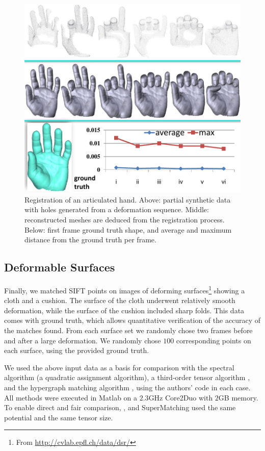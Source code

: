 \begin{figure}[t!]
\centering
  \includegraphics[width=0.95\linewidth]{figures/3DHand.pdf}
  \caption{Registration of an articulated hand.
  Above: partial synthetic data with holes generated from a deformation sequence.
  Middle: reconstructed meshes are deduced from the registration process.
  Below: first frame ground truth shape, and average and maximum distance from the ground truth per frame.}
\label{fig:3DHand}
\end{figure}

\subsection{Deformable Surfaces}
\label{subsec:2DDeformable}

Finally, we matched SIFT points on images of deforming surfaces\footnote{From \url{http://cvlab.epfl.ch/data/dsr/}} showing a cloth and a cushion.
The surface of the cloth underwent relatively smooth deformation, while the surface of the cushion included sharp folds.
This data comes with ground truth, which allows quantitative verification of the accuracy of the matches found.
From each surface set we randomly chose two frames before and after a large deformation.
We randomly chose $100$ corresponding points on each surface, using the provided ground truth.

We used the above input data as a basis for comparison with the spectral algorithm \cite{Cour06} (a quadratic assignment algorithm),
a third-order tensor algorithm \cite{Duchenne09},
and the hypergraph matching algorithm \cite{Zass08}, using the authors' code in each case.
All methods were executed in Matlab on a $2.3$GHz Core2Duo with $2$GB memory.
To enable direct and fair comparison,
\cite{Duchenne09}, \cite{Zass08} and SuperMatching used the same potential and the same tensor size.

